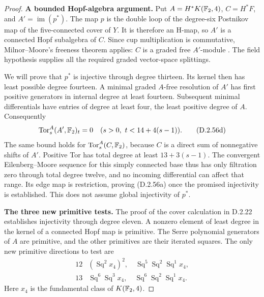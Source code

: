 \begin{proof}
\textbf{A bounded Hopf-algebra argument.}
Put $A=H^*K(\mathbb F_2,4)$, $C=H^*F$, and $A'=\operatorname{im}(p^*)$.
The map $p$ is the double loop of the degree-six Postnikov map of
the five-connected cover of $Y$.  It is therefore an H-map, so
$A'$ is a connected Hopf subalgebra of $C$.  Since cup multiplication
is commutative, Milnor--Moore's freeness theorem applies:
$C$ is a graded free $A'$-module
\cite[Proposition 4.9 and the following paragraph, pp.~229--230]
{I_MilnorMoore1965}.  The field hypothesis supplies all the required
graded vector-space splittings.

We will prove that $p^*$ is injective through degree thirteen.
Its kernel then has least possible degree fourteen.  A minimal
graded $A$-free resolution of $A'$ has first positive generators
in internal degree at least fourteen.  Subsequent minimal
differentials have entries of degree at least four, the least
positive degree of $A$.  Consequently
\[
 \operatorname{Tor}_s^A(A',\mathbb F_2)_t=0
       \quad(s>0,\ t<14+4(s-1)).
 \tag{D.2.56d}
\]
The same bound holds for $\operatorname{Tor}_s^A(C,\mathbb F_2)$,
because $C$ is a direct sum of nonnegative shifts of $A'$.
Positive Tor has total degree at least $13+3(s-1)$.
The convergent Eilenberg--Moore sequence for this simply connected
base thus has only filtration zero through total degree twelve,
and no incoming differential can affect that range.  Its edge
map is restriction, proving \textup{(D.2.56a)} once the promised
injectivity is established.  This does not assume global
injectivity of $p^*$.

\textbf{The three new primitive tests.}
The proof of the cover calculation in D.2.22 establishes
injectivity through degree eleven.  A nonzero element of least
degree in the kernel of a connected Hopf map is primitive.
The Serre polynomial generators of $A$ are primitive, and the
other primitives are their iterated squares.  The only new
primitive directions to test are
\[
 \begin{array}{c|l}
 12&(\operatorname{Sq}^2x_4)^2,
             \quad\operatorname{Sq}^5\operatorname{Sq}^2
                       \operatorname{Sq}^1x_4,\\
 13&\operatorname{Sq}^6\operatorname{Sq}^3x_4,
             \quad\operatorname{Sq}^6\operatorname{Sq}^2
                       \operatorname{Sq}^1x_4.
 \end{array}
 \tag{D.2.56e}
\]
Here $x_4$ is the fundamental class of $K(\mathbb F_2,4)$.


\end{proof}
